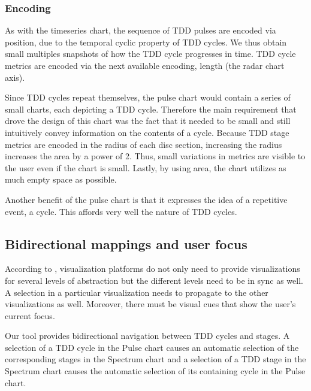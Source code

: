 \documentclass[journal]{vgtc}                %
\begin{document}
\subsubsection{Encoding}

As with the timeseries chart, the sequence of TDD pulses are encoded via position, due to the temporal cyclic property of TDD cycles. We thus obtain small multiples snapshots of how the TDD cycle progresses in time.
TDD cycle metrics are encoded via the next available encoding, length (the radar chart axis).

Since TDD cycles repeat themselves, the pulse chart would contain a series of small charts, each depicting a TDD cycle.
Therefore the main requirement that drove the design of this chart was the fact that it needed to be small and still intuitively convey information on the contents of a cycle.
Because TDD stage metrics are encoded in the radius of each disc section, increasing the radius increases the area by a power of 2.
Thus, small variations in metrics are visible to the user even if the chart is small.
Lastly, by using area, the chart utilizes as much empty space as possible.

Another benefit of the pulse chart is that it expresses the idea of a repetitive event, a cycle.
This affords very well the nature of TDD cycles.

\subsection{Bidirectional mappings and user focus}

According to \cite{two}, visualization platforms do not only need to provide visualizations for several levels of abstraction but the different levels need to be in sync as well.
A selection in a particular visualization needs to propagate to the other visualizations as well.
Moreover, there must be visual cues that show the user's current focus.

Our tool provides bidirectional navigation between TDD cycles and stages.
A selection of a TDD cycle in the Pulse chart causes an automatic selection of the corresponding stages in the Spectrum chart and a selection of a TDD stage in the Spectrum chart causes the automatic selection of its containing cycle in the Pulse chart.
\end{document}
